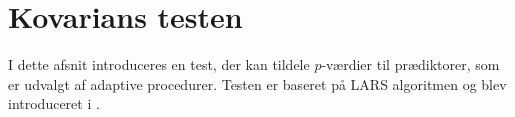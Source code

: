 \section{Kovarians testen} \label{subsec:kovarians_test}
I dette afsnit introduceres en test, der kan tildele \(p\)-værdier til prædiktorer, som er udvalgt af adaptive procedurer.
Testen er baseret på LARS algoritmen og blev introduceret i \citep{lockhart}.



